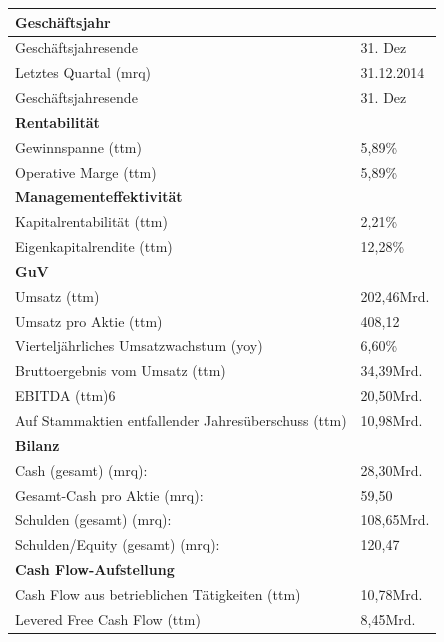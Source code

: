 \documentclass[12pt]{article}
\begin{document}
\newpage
\begin{table}
\begin{tabular}{|p{}|p{}|}
\hline
\textbf{Geschäftsjahr}  & \\  \hline
Geschäftsjahresende &   31. Dez \\  
Letztes Quartal (mrq) &   31.12.2014 \\  
Geschäftsjahresende &   31. Dez \\  \hline
\textbf{Rentabilität}  & \\  \hline
 Gewinnspanne (ttm)&   5,89\% \\  
 Operative Marge (ttm)&	5,89\%    \\ \hline
 \textbf{Managementeffektivität}  & \\  \hline
Kapitalrentabilität (ttm) & 2,21\%  \\  
Eigenkapitalrendite (ttm) &   12,28\%  \\  \hline
 \textbf{GuV}  & \\  \hline

 Umsatz (ttm)&   202,46Mrd. \\  
 Umsatz pro Aktie (ttm)&  408,12  \\  
 
Vierteljährliches Umsatzwachstum (yoy)&   6,60\% \\  
 Bruttoergebnis vom Umsatz (ttm)&34,39Mrd.    \\  
EBITDA (ttm)6 &  20,50Mrd.  \\  
 Auf Stammaktien entfallender Jahresüberschuss (ttm) &  10,98Mrd.  \\  \hline
  \textbf{Bilanz}  & \\  \hline


Cash (gesamt) (mrq): &  	28,30Mrd.  \\  

Gesamt-Cash pro Aktie (mrq): & 59,50   \\  
Schulden (gesamt) (mrq): &   108,65Mrd. \\  
 Schulden/Equity (gesamt) (mrq):&  	120,47  \\  \hline
   \textbf{Cash Flow-Aufstellung}  & \\  \hline

Cash Flow aus betrieblichen Tätigkeiten (ttm) &  10,78Mrd.  \\  
Levered Free Cash Flow (ttm) &  8,45Mrd.  \\  \hline

\end{tabular}
\end{table}
\cite{yahoofinanzenvw}
\end{document}
